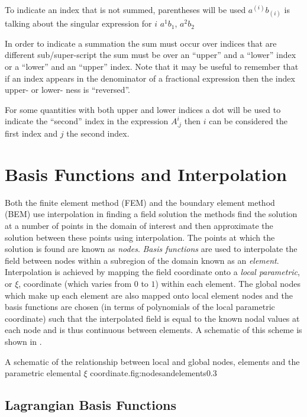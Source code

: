 To indicate an index that is not summed, parentheses will be used
\ie $a^{(i)}b_{(i)}$ is talking about the singular expression for $i$ \eg
$a^{1}b_{1}$, $a^{2}b_{2}$ \etc

In order to indicate a summation the sum must occur over indices that are
different sub/super-script \ie the sum must be over an ``upper'' and a
``lower'' index or a ``lower'' and an ``upper'' index. Note that it may be
useful to remember that if an index appears in the denominator of a fractional
expression then the index upper- or lower- ness is ``reversed''. 

For some quantities with both upper and lower indices a dot will be used to
indicate the ``second'' index \eg in the expression $A^{i}_{.j}$ then $i$ can
be considered the first index and $j$ the second index.

\section{Basis Functions and Interpolation}
\label{sec:basisfunctions}

Both the finite element method (FEM) and the boundary element method (BEM) use
interpolation in finding a field solution \ie the methods find the solution at
a number of points in the domain of interest and then approximate the solution
between these points using interpolation. The points at which the solution is
found are known as \emph{nodes}. \emph{Basis functions} are used to
interpolate the field between nodes within a subregion of the domain known as
an \emph{element}. Interpolation is achieved by mapping the field coordinate
onto a \emph{local parametric}, or $\xi$, coordinate (which varies from $0$ to
$1$) within each element. The global nodes which make up each element are also
mapped onto local element nodes and the basis functions are chosen (in terms
of polynomials of the local parametric coordinate) such that the interpolated
field is equal to the known nodal values at each node and is thus continuous
between elements. A schematic of this
scheme is shown in .

 {A schematic of the relationship between local
  and global nodes, elements and the parametric elemental $\xi$
  coordinate.}{fig:nodesandelements}{0.3}

\subsection{Lagrangian Basis Functions}
\label{sec:lagrangebasisfunctions}

